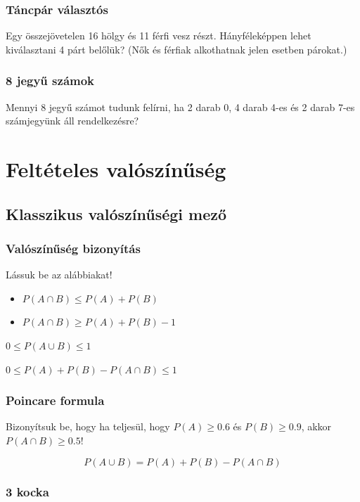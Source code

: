 \documentclass[a4paper]{article}
\begin{document}
\subsubsection{Táncpár választós}

Egy összejövetelen 16 hölgy és 11 férfi vesz részt.
Hányféleképpen lehet kiválasztani 4 párt belőlük? (Nők és férfiak alkothatnak jelen esetben párokat.)

\subsubsection{8 jegyű számok}

Mennyi 8 jegyű számot tudunk felírni, ha 2 darab 0, 4 darab 4-es és 2 darab 7-es számjegyünk áll rendelkezésre?

\section{Feltételes valószínűség}

\subsection{Klasszikus valószínűségi mező}

\subsubsection{Valószínűség bizonyítás}

Lássuk be az alábbiakat!
\begin{itemize}
\item $P(A \cap B) \leq P(A) + P(B)$
\item $P(A \cap B) \geq P(A) + P(B) - 1$
\end{itemize}

$0 \leq P(A \cup B) \leq 1$

$0 \leq P(A) + P(B) - P(A \cap B) \leq 1$

\subsubsection{Poincare formula}

Bizonyítsuk be, hogy ha teljesül, hogy $P(A) \geq 0.6$ és $P(B) \geq 0.9$, akkor $P(A \cap B) \geq 0.5$!

\[
P(A \cup B) = P(A) + P(B) - P(A \cap B)
\]

\subsubsection{3 kocka}
\end{document}
